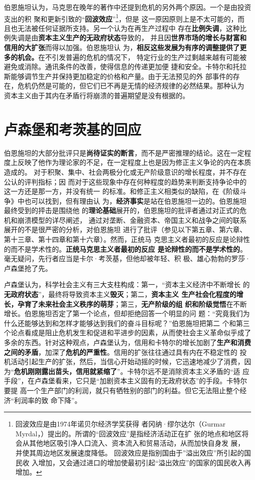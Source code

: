 伯恩施坦认为，马克思在晚年的著作中还提到危机的另外两个原因。一个是由投资支出的积
聚和更新引致的“\textbf{回波效应}”\footnote{回波效应是由1974年诺贝尔经济学奖获得
  者冈纳·缪尔达尔（Gurmar Myrdal，）提出的。所谓的“回波效应”是指经济活动正在扩
  张的地点和地区将会从其他地区吸引净人口流入、资本流入和贸易活动，从而加快自身发
  展，并使其周边地区发展速度降低。 回波效应是指别国由于”溢出效应”所引起的国民收
  入增加，又会通过进口的增加使最初引起“溢出效应”的国家的国民收入再增加。}，但是
这一原因原则上是不太可能的，而且也无法被任何证据所支持。另一个认为在再生产过程中
存在\textbf{比例失调}，这种比例失调是由\textbf{资本主义生产的无政府状态}导致的，
并且因\textbf{世界市场的增长与财富和信用的大扩张}而得以加强。伯恩施坦认
为，\textbf{相反这些发展为有序的调整提供了更多的机会。}在不引发普遍的危机的情况下，
特定行业的生产过剩越来越有可能被避免或消除。通讯条件的改善，使得信息的传递更加便
捷和安全。卡特尔和托拉斯能够调节生产并保持更加稳定的价格和产量。由于无法预见的外
部事件的存在，危机仍然是可能的，但它们已不再是无情的经济规律的必然结果。那种认为
资本主义由于其内在矛盾行将崩溃的普遍期望是没有根据的。

\section{卢森堡和考茨基的回应}
伯恩施坦的大部分批评只是\textbf{尚待证实的断言}，而不是严密推理的结论。这在一定程
度上反映了他作为理论家的不足，在一定程度上也是因为修正主义争论的内在本质造成的。
对于积聚、集中、社会两极分化或无产阶级意识的增长程度，并不存在公认的评判指标；因
而对于这些现象中存在何种程度的趋势来判断支持争论中的这一方还是那一方，并没有统一
的标准。和修正主义相类似的缺陷，在《阶级斗争》中也可以找到，但有理由认
为，\textbf{经济事实}是站在伯恩施坦一边的。伯恩施坦最终受到的抨击是围绕他
的\textbf{理论基础}展开的，伯恩施坦的批评者通过对正式的危机和崩溃模型的详尽阐述，
通过对垄断、金融资本、帝国主义和战争之间的联系展开的不是很严密的分析，对伯恩施坦
进行了批评（参见以下第五章、第六章、第十三章、第十四章和第十六章）。然而，正统马
克思主义者最初的反应是论辩性的而不是学术性的。\textbf{正统马克思主义者最初的反应
  是论辩性的而不是学术性的}。毫无疑问，先行者应当是卡尔·考茨基，但他却被年轻、积
极、雄心勃勃的罗莎·卢森堡抢了先。

卢森堡认为，科学社会主义有三大支柱构成：第一，“资本主义经济中不断增长
的\textbf{无政府状态}”，最终将导致资本主义\textbf{毁灭}；第二，\textbf{资本主义
  生产社会化程度的增长，孕育了未来社会主义秩序的萌芽}；第三，\textbf{无产阶级的组
  织和阶级觉悟}在不断增长。伯恩施坦否定了第一个论点，但却拒绝回答一个明显的问
题：“究竟我们为什么还能够达到和怎样才能够达到我们的奋斗目标呢？”伯恩施坦把第二
个和第三个论点看成是阻止危机发生和促进和平进步的因素，从而使社会主义革命似乎成了
多余的东西。针对这种观点，卢森堡认为，信用和卡特尔的增长加剧了\textbf{生产和消费
  之间的矛盾}，加深了\textbf{危机的严重性}。信用的扩张往往通过具有内在不稳定性的
投机活动引起生产的扩张，然后，当信心开始动摇的时候，它迅速地减少了消费，因
为“\textbf{危机刚刚露出苗头，信用就紧缩了}”。卡特尔远不是消除资本主义矛盾的“适
应手段”，在卢森堡看来，它只是“加剧资本主义固有的无政府状态”的手段。卡特尔要提
高一个生产部门的利润，就只有牺牲别的部门的利益。但它无法阻止整个经济“利润率的致
命下降”。

